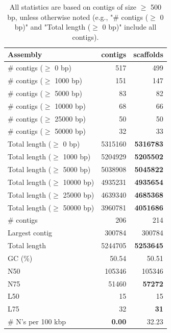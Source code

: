 \documentclass[12pt,a4paper]{article}
\begin{document}
\begin{table}[ht]
\begin{center}
\caption{All statistics are based on contigs of size $\geq$ 500 bp, unless otherwise noted (e.g., "\# contigs ($\geq$ 0 bp)" and "Total length ($\geq$ 0 bp)" include all contigs).}
\begin{tabular}{|l*{2}{|r}|}
\hline
Assembly & contigs & scaffolds \\ \hline
\# contigs ($\geq$ 0 bp) & 517 & 499 \\ \hline
\# contigs ($\geq$ 1000 bp) & 151 & 147 \\ \hline
\# contigs ($\geq$ 5000 bp) & 83 & 82 \\ \hline
\# contigs ($\geq$ 10000 bp) & 68 & 66 \\ \hline
\# contigs ($\geq$ 25000 bp) & 50 & 50 \\ \hline
\# contigs ($\geq$ 50000 bp) & 32 & 33 \\ \hline
Total length ($\geq$ 0 bp) & 5315160 & {\bf 5316783} \\ \hline
Total length ($\geq$ 1000 bp) & 5204929 & {\bf 5205502} \\ \hline
Total length ($\geq$ 5000 bp) & 5038908 & {\bf 5045822} \\ \hline
Total length ($\geq$ 10000 bp) & 4935231 & {\bf 4935654} \\ \hline
Total length ($\geq$ 25000 bp) & 4639340 & {\bf 4685368} \\ \hline
Total length ($\geq$ 50000 bp) & 3960781 & {\bf 4051686} \\ \hline
\# contigs & 206 & 214 \\ \hline
Largest contig & 300784 & 300784 \\ \hline
Total length & 5244705 & {\bf 5253645} \\ \hline
GC (\%) & 50.54 & 50.51 \\ \hline
N50 & 105346 & 105346 \\ \hline
N75 & 51460 & {\bf 57272} \\ \hline
L50 & 15 & 15 \\ \hline
L75 & 32 & {\bf 31} \\ \hline
\# N's per 100 kbp & {\bf 0.00} & 32.23 \\ \hline
\end{tabular}
\end{center}
\end{table}
\end{document}
